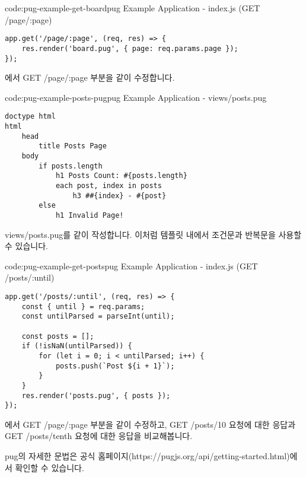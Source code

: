 \begin{codeenv}{code:pug-example-get-board}{pug Example Application - index.js (GET /page/:page)}\begin{verbatim}
app.get('/page/:page', (req, res) => {
    res.render('board.pug', { page: req.params.page });
});
\end{verbatim}
\end{codeenv}

에서 GET /page/:page 부분을 \와 같이 수정합니다.

\begin{codeenv}{code:pug-example-posts-pug}{pug Example Application - views/posts.pug}\begin{verbatim}
doctype html
html
    head
        title Posts Page
    body
        if posts.length
            h1 Posts Count: #{posts.length}
            each post, index in posts
                h3 ##{index} - #{post}
        else
            h1 Invalid Page!
\end{verbatim}
\end{codeenv}

views/posts.pug를 \와 같이 작성합니다. 이처럼 템플릿 내에서 조건문과 반복문을 사용할 수 있습니다.

\begin{codeenv}{code:pug-example-get-posts}{pug Example Application - index.js (GET /posts/:until)}\begin{verbatim}
app.get('/posts/:until', (req, res) => {
    const { until } = req.params;
    const untilParsed = parseInt(until);

    const posts = [];
    if (!isNaN(untilParsed)) {
        for (let i = 0; i < untilParsed; i++) {
            posts.push(`Post ${i + 1}`);
        }
    }
    res.render('posts.pug', { posts });
});
\end{verbatim}
\end{codeenv}

에서 GET /page/:page 부분을 \와 같이 수정하고, GET /posts/10 요청에 대한 응답과 GET /posts/tenth 요청에 대한 응답을 비교해봅니다.

pug의 자세한 문법은 공식 홈페이지(https://pugjs.org/api/getting-started.html)에서 확인할 수 있습니다.
